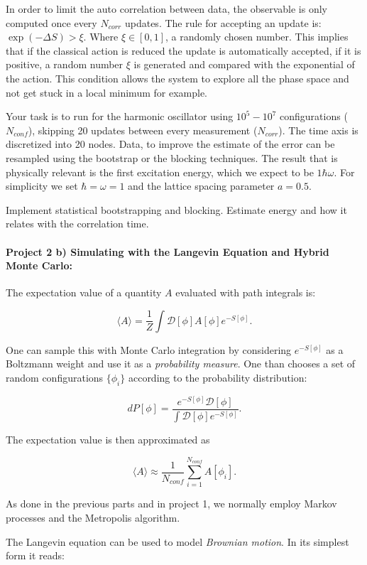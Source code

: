 \documentclass[%
oneside,                 %
final,                   %
10pt]{article}
\begin{document}
\noindent
In order to limit the auto correlation between data, the observable is
only computed once every $N_{corr}$ updates.  The rule for accepting
an update is: $\exp(-\Delta S) > \xi$. Where $\xi \in [0,1]$, a
randomly chosen number. This implies that if the classical action is
reduced the update is automatically accepted, if it is positive, a
random number $\xi$ is generated and compared with the exponential of
the action. This condition allows the system to explore all the phase
space and not get stuck in a local minimum for example.

Your task is to
run for the harmonic oscillator  using $10^5-10^7$ configurations ($N_{conf}$), skipping 20
updates between every measurement ($N_{corr}$). The time axis is
discretized into 20 nodes. Data, to improve the estimate of the error can be resampled using the bootstrap or the blocking
techniques.  The result that is physically relevant is the first
excitation energy, which we expect to be $1\hbar\omega$. For
simplicity we set $\hbar=\omega=1$ and the lattice spacing parameter
$a = 0.5$.

Implement statistical bootstrapping and blocking. 
Estimate energy and how it relates  with the correlation time.

\paragraph{Project 2 b) Simulating with the Langevin Equation and Hybrid Monte Carlo:}
The expectation value of a quantity $A$ evaluated with path integrals is:

\[
    \langle A\rangle = \frac{1}{Z}\int \mathcal{D} [\phi] A[\phi]e^{-S[\phi]}.
\]

One can sample this with Monte Carlo integration by considering
$e^{-S[\phi]}$ as a Boltzmann weight and use it as a
\textit{probability measure}. One than chooses a set of random
configurations $\{\phi_i\}$ according to the probability distribution:

\[
    dP[\phi] = \frac{e^{-S[\phi]}\mathcal{D}[\phi]}{\int \mathcal{D}[\phi] e^{-S[\phi]}}.
\]

The expectation value is then approximated as

\[
    \langle A\rangle \approx \frac{1}{N_{conf}} \sum_{i=1}^{N_{conf}} A[\phi_i].
\]

As done in the previous parts and in project 1, we normally employ Markov processes and the Metropolis algorithm.

The Langevin equation can be used to model \textit{Brownian motion}. In its simplest form it reads:
\end{document}

